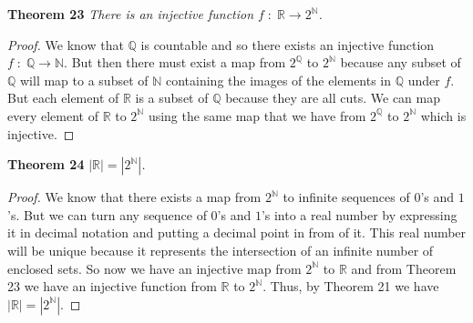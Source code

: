 \documentclass{article}
\begin{document}
\begin{flushleft}
\textbf{Theorem 23}
\textsl{There is an injective function $f \; : \; \mathbb{R} \rightarrow 2^{\mathbb{N}}$.}
\begin{proof}
We know that $\mathbb{Q}$ is countable and so there exists an injective function $f \; : \; \mathbb{Q} \rightarrow \mathbb{N}$. But then there must exist a map from $2^{\mathbb{Q}}$ to $2^{\mathbb{N}}$ because any subset of $\mathbb{Q}$ will map to a subset of $\mathbb{N}$ containing the images of the elements in $\mathbb{Q}$ under $f$. But each element of $\mathbb{R}$ is a subset of $\mathbb{Q}$ because they are all cuts. We can map every element of $\mathbb{R}$ to $2^{\mathbb{N}}$ using the same map that we have from $2^{\mathbb{Q}}$ to $2^{\mathbb{N}}$ which is injective.
\end{proof}

\textbf{Theorem 24}
\textsl{$|\mathbb{R}|=|2^{\mathbb{N}}|$.}
\begin{proof}
We know that there exists a map from $2^{\mathbb{N}}$ to infinite sequences of $0$'s and $1$'s. But we can turn any sequence of $0$'s and $1$'s into a real number by expressing it in decimal notation and putting a decimal point in from of it. This real number will be unique because it represents the intersection of an infinite number of enclosed sets. So now we have an injective map from $2^{\mathbb{N}}$ to $\mathbb{R}$ and from Theorem 23 we have an injective function from $\mathbb{R}$ to $2^{\mathbb{N}}$. Thus, by Theorem 21 we have $|\mathbb{R}| = |2^{\mathbb{N}}|$.
\end{proof}

\end{flushleft}
\end{document}
